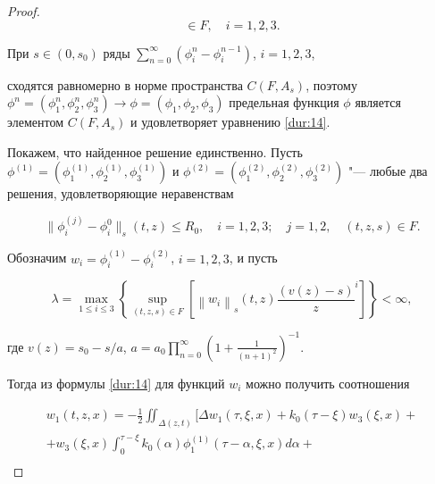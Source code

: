 \begin{proof}
\[ \in F,\quad  i = 1,2,3.\]







     При  $s \in (0,{s_0})$ ряды   $\sum_{n = 0}^\infty  {\left( {\phi _i^n - \phi _i^{n - 1}} \right)}$,   $i = 1, 2, 3$,

      сходятся равномерно    в норме пространства $C(F,{A_s})$,  поэтому ${\phi ^n} = (\phi _1^n,\phi _2^n,\phi _3^n) \to \phi  = (\phi _1,\phi _2,\phi_3)$  предельная функция $\phi $ является элементом  $C(F,{A_s})$ и   удовлетворяет уравнению \eqref{dur:14}.





Покажем, что найденное решение единственно. Пусть ${\phi ^{(1)}} = (\phi _1^{(1)},\phi _2^{(1)},\phi _3^{(1)})$ и ${\phi ^{(2)}} = (\phi _1^{(2)},

\phi _2^{(2)},\phi _3^{(2)})$ "--- любые два решения, удовлетворяющие неравенствам 

\[

\| \phi _i^{(j)} - \phi _i^0\|_s(t,z)

 \leqslant {R_0},\quad  i = 1, 2, 3;\quad  j = 1, 2,\quad  (t, z, s)  \in {F}.

 \]

 Обозначим ${w_i} = \phi _i^{(1)} - \phi _i^{(2)}$,  $i = 1, 2, 3$,   и пусть

\[\lambda  = \mathop {\max }\limits_{1 \leqslant i \leqslant 3} \left\{ {\mathop {\sup }\limits_{(t,z,s) \in F} \left[ {{{\left\| {{w_i}}

\right\|}_s}(t,z){{\frac{{\left( {v(z) - s} \right)}}{z}}^i}} \right]} \right\} < \infty, \]

 где  $v(z) = s_0 - s/a$, $a = {a_0}{\prod\limits_{n = 0}^\infty  {\left( {1 + \frac{1}{{{{(n + 1)}^2}}}} \right)} ^{ - 1}}$.

 Тогда из  формулы \eqref{dur:14} для функций ${w_i}$ можно  получить соотношения

\begin{multline*}

{w_1}(t,z,x) =  - \frac 12 \iint_{\Delta (z,t)}  \biggl[ {\Delta {w_1}(\tau ,\xi ,x)} + {k_0}(\tau  - \xi ){w_3}(\xi ,x)+ 

\\

+{w_3}(\xi ,x)\int_0^{\tau  - \xi } {{k_0}(\alpha )} \phi _1^{(1)}(\tau  - \alpha ,\xi ,x)d\alpha  +

\\


\end{multline*}
\end{proof}
